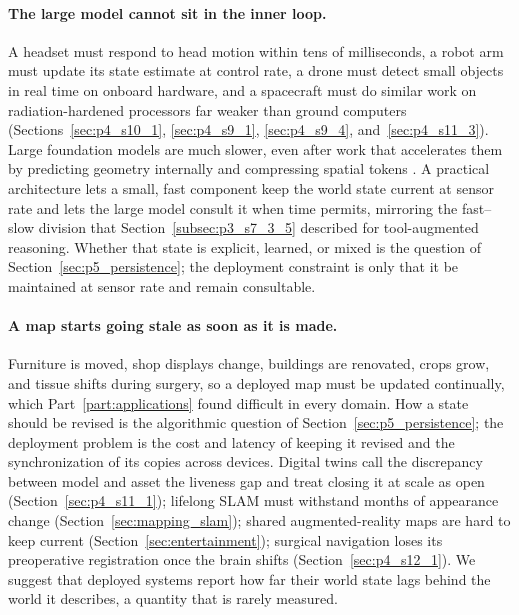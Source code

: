 \paragraph{The large model cannot sit in the inner loop.}
A headset must respond to head motion within tens of milliseconds, a robot arm must update its state estimate at control rate, a drone must detect small objects in real time on onboard hardware, and a spacecraft must do similar work on radiation-hardened processors far weaker than ground computers (Sections~\ref{sec:p4_s10_1}, \ref{sec:p4_s9_1}, \ref{sec:p4_s9_4}, and~\ref{sec:p4_s11_3}).
Large foundation models are much slower, even after work that accelerates them by predicting geometry internally and compressing spatial tokens \cite{li2026geothinkerf}.
A practical architecture lets a small, fast component keep the world state current at sensor rate and lets the large model consult it when time permits, mirroring the fast--slow division that Section~\ref{subsec:p3_s7_3_5} described for tool-augmented reasoning.
Whether that state is explicit, learned, or mixed is the question of Section~\ref{sec:p5_persistence}; the deployment constraint is only that it be maintained at sensor rate and remain consultable.

\paragraph{A map starts going stale as soon as it is made.}
Furniture is moved, shop displays change, buildings are renovated, crops grow, and tissue shifts during surgery, so a deployed map must be updated continually, which Part~\ref{part:applications} found difficult in every domain.
How a state should be revised is the algorithmic question of Section~\ref{sec:p5_persistence}; the deployment problem is the cost and latency of keeping it revised and the synchronization of its copies across devices.
Digital twins call the discrepancy between model and asset the liveness gap and treat closing it at scale as open (Section~\ref{sec:p4_s11_1}); lifelong SLAM must withstand months of appearance change (Section~\ref{sec:mapping_slam}); shared augmented-reality maps are hard to keep current (Section~\ref{sec:entertainment}); surgical navigation loses its preoperative registration once the brain shifts (Section~\ref{sec:p4_s12_1}).
We suggest that deployed systems report how far their world state lags behind the world it describes, a quantity that is rarely measured.

